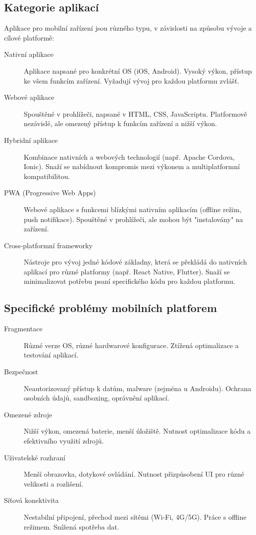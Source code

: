 \subsection{Kategorie aplikací}

Aplikace pro mobilní zařízení jsou různého typu, v závislosti na způsobu vývoje a 
cílové platformě:

\begin{description}
    \item[Nativní aplikace] Aplikace napsané pro konkrétní OS (iOS, Android). 
    Vysoký výkon, přístup ke všem funkcím zařízení. Vyžadují vývoj pro každou platformu zvlášť.
    \item[Webové aplikace] Spouštěné v prohlížeči, napsané v HTML, CSS, JavaScriptu. 
    Platformově nezávislé, ale omezený přístup k funkcím zařízení a nižší výkon.
    \item[Hybridní aplikace] Kombinace nativních a webových technologií (např. 
    Apache Cordova, Ionic). Snaží se nabídnout kompromis mezi výkonem 
    a multiplatformní kompatibilitou.
    \item[PWA (Progressive Web Apps)] Webové aplikace s funkcemi blízkými nativním 
    aplikacím (offline režim, push notifikace). Spouštěné v prohlížeči, ale mohou být 
    "instalovány" na zařízení.
    \item[Cross-platformní frameworky] Nástroje pro vývoj jedné kódové základny, 
    která se překládá do nativních aplikací pro různé platformy 
    (např. React Native, Flutter). Snaží se minimalizovat potřebu psaní specifického 
    kódu pro každou platformu.
\end{description}

\subsection{Specifické problémy mobilních platforem}
\begin{description}
    \item[Fragmentace] Různé verze OS, různé hardwarové konfigurace. Ztížená 
    optimalizace a testování aplikací.
    \item[Bezpečnost] Neautorizovaný přístup k datům, malware (zejména u Androidu).
    Ochrana osobních údajů, sandboxing, oprávnění aplikací.
    \item[Omezené zdroje] Nižší výkon, omezená baterie, menší úložiště. Nutnost 
    optimalizace kódu a efektivního využití zdrojů.
    \item[Uživatelské rozhraní] Menší obrazovka, dotykové ovládání. Nutnost 
    přizpůsobení UI pro různé velikosti a rozlišení.
    \item[Síťová konektivita] Nestabilní připojení, přechod mezi sítěmi (Wi-Fi, 4G/5G). 
    Práce s offline režimem. Snížená spotřeba dat.
\end{description}

